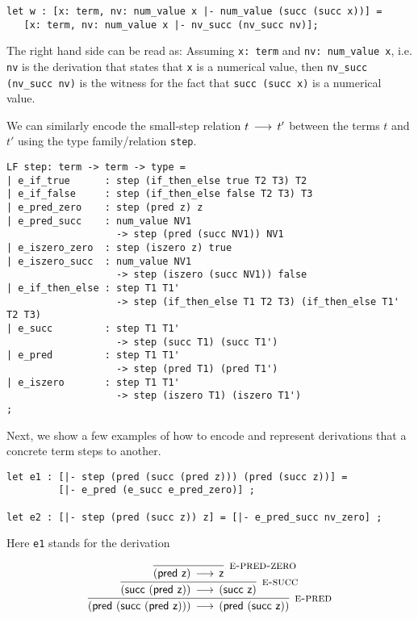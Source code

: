 \begin{lstlisting}
let w : [x: term, nv: num_value x |- num_value (succ (succ x))] =
   [x: term, nv: num_value x |- nv_succ (nv_succ nv)];
\end{lstlisting}

The  right  hand  side   can  be  read  as:   Assuming  \lstinline!x: term!  and
\lstinline!nv: num_value x!,  i.e. \lstinline!nv!  is the derivation that states
that \lstinline!x! is  a numerical value,  then \lstinline!nv_succ (nv_succ nv)!
is the witness for the fact that \lstinline!succ (succ x)! is a numerical value.


We can similarly encode  the small-step relation $t \mathrel{\,\longrightarrow\,} t'$ between the terms
$t$ and $t'$ using the type family/relation \lstinline!step!.

\begin{lstlisting}
LF step: term -> term -> type =
| e_if_true      : step (if_then_else true T2 T3) T2
| e_if_false     : step (if_then_else false T2 T3) T3
| e_pred_zero    : step (pred z) z
| e_pred_succ    : num_value NV1
                   -> step (pred (succ NV1)) NV1
| e_iszero_zero  : step (iszero z) true
| e_iszero_succ  : num_value NV1
                   -> step (iszero (succ NV1)) false
| e_if_then_else : step T1 T1'
                   -> step (if_then_else T1 T2 T3) (if_then_else T1' T2 T3)
| e_succ         : step T1 T1'
                   -> step (succ T1) (succ T1')
| e_pred         : step T1 T1'
                   -> step (pred T1) (pred T1')
| e_iszero       : step T1 T1'
                   -> step (iszero T1) (iszero T1')
;
\end{lstlisting}

Next,  we show a few examples of  how to encode and represent derivations that a
concrete term steps to another.

\begin{lstlisting}
let e1 : [|- step (pred (succ (pred z))) (pred (succ z))] =
         [|- e_pred (e_succ e_pred_zero)] ;

let e2 : [|- step (pred (succ z)) z] = [|- e_pred_succ nv_zero] ;
\end{lstlisting}


Here \lstinline!e1! stands for the derivation


\[
\begin{array}{c}
\infer[\EPred]{(\tmpred {(\tmsucc {(\tmpred {\tmzero})})}) \Steps (\tmpred {(\tmsucc {\tmzero})})}
{\infer[\ESuc]{(\tmsucc {(\tmpred {\tmzero})}) \Steps (\tmsucc {\tmzero} )}
 {\infer[\EPredZ]{(\tmpred {\tmzero}) \Steps \tmzero}{}}
}
\end{array}
\]

